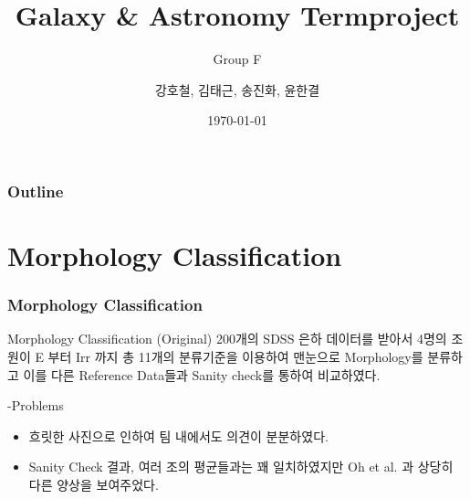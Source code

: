 \documentclass[xcolor={dvipsnames,table}]{beamer}
\title[GA2 Termproject]{
  Galaxy \& Astronomy Termproject }
\subtitle{Group F}
\author[Group F]{
  강호철, 김태근, 송진화, 윤한결 \\\medskip}
\institute[Yonsei University]{
  연세대학교 천문우주학과 \\ }
\date[\today]{\today}
\begin{document}

\begin{frame}
  \titlepage
\end{frame}

\begin{frame}
  \frametitle{Outline}

  \tableofcontents
\end{frame}
\section{Morphology Classification}

\begingroup
\small
\begin{frame}
  \frametitle{Morphology Classification}
  
  \begin{block}{Morphology Classification (Original)}
    200개의 SDSS 은하 데이터를 받아서 4명의 조원이 E 부터 Irr 까지 총 11개의 분류기준을 이용하여 맨눈으로 Morphology를 분류하고 
    이를 다른 Reference Data들과 Sanity check를 통하여 비교하였다.
  \end{block}
  \vspace{0.5cm}
  -Problems
  \begin{itemize}
   \item 흐릿한 사진으로 인하여 팀 내에서도 의견이 분분하였다.
   \item Sanity Check 결과, 여러 조의 평균들과는 꽤 일치하였지만 Oh et al. 과 상당히 다른 양상을 보여주었다.
  \end{itemize}


\end{frame}
\end{document}
